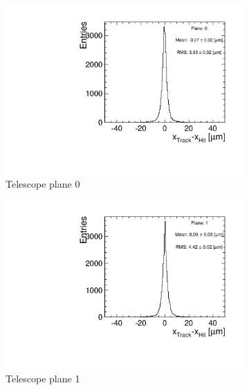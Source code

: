 \begin{figure}[htbp] \centering
  \begin{subfigure}[b]{0.3\textwidth}
    \includegraphics[width=\textwidth]{figures/Telescope/biasedResiduals/BiasedResiduals_run49_PlaneXRMS0.pdf}
    \caption{Telescope plane 0}
  \end{subfigure}\hfill
  \begin{subfigure}[b]{0.3\textwidth}
    \includegraphics[width=\textwidth]{figures/Telescope/biasedResiduals/BiasedResiduals_run49_PlaneXRMS1.pdf}
    \caption{Telescope plane 1}
  \end{subfigure}\hfill
  \begin{subfigure}[b]{0.3\textwidth}

\end{subfigure}
\end{figure}
